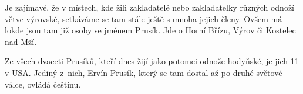 \documentclass[../dejiny-rodu-prusiku.tex]{subfiles}
\begin{document}
Je zajímavé, že v místech, kde žili zakladatelé nebo zakladatelky různých odnoží větve výrovské, setkáváme se tam stále ještě s mnoha jejich členy. Ovšem má­lokde jsou tam již osoby se jménem Prusík. Jde o Horní Břízu, Výrov či Kostelec nad Mží.

Ze všech dvaceti Prusíků, kteří dnes žijí jako potomci odnože hodyňské, je jich 11 v USA. Jediný z nich, Ervín Prusík, který se tam dostal až po druhé světové válce, ovládá češtinu.
\end{document}
